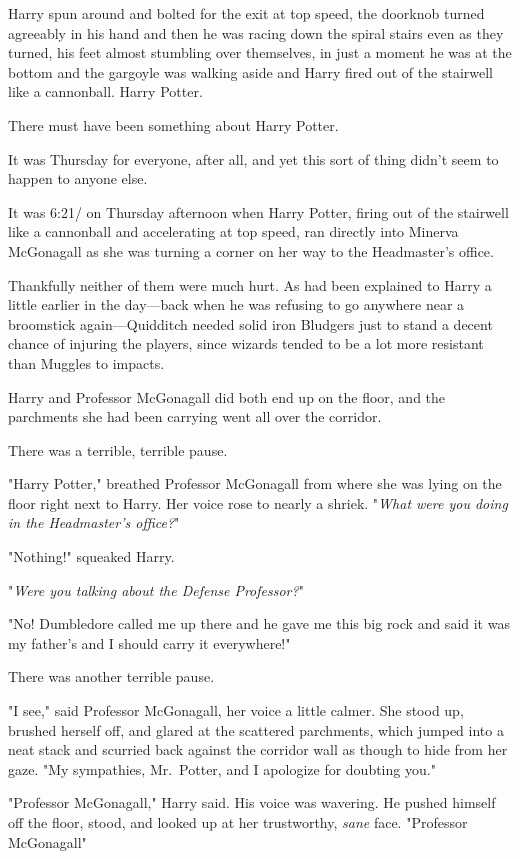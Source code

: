 Harry spun around and bolted for the exit at top speed, the doorknob turned
agreeably in his hand and then he was racing down the spiral stairs even as
they turned, his feet almost stumbling over themselves, in just a moment he was
at the bottom and the gargoyle was walking aside and Harry fired out of the
stairwell like a cannonball.
\sbreak
Harry Potter.

There must have been something about Harry Potter.

It was Thursday for everyone, after all, and yet this sort of thing didn't seem
to happen to anyone else.

It was 6:21\PM/ on Thursday afternoon when Harry Potter, firing out of the
stairwell like a cannonball and accelerating at top speed, ran directly into
Minerva McGonagall as she was turning a corner on her way to the Headmaster's
office.

Thankfully neither of them were much hurt. As had been explained to Harry a
little earlier in the day---back when he was refusing to go anywhere near a
broomstick again---Quidditch needed solid iron Bludgers just to stand a decent
chance of injuring the players, since wizards tended to be a lot more resistant
than Muggles to impacts.

Harry and Professor McGonagall did both end up on the floor, and the parchments
she had been carrying went all over the corridor.

There was a terrible, terrible pause.

"Harry Potter," breathed Professor McGonagall from where she was lying on the
floor right next to Harry. Her voice rose to nearly a shriek. "\emph{What were
you doing in the Headmaster's office?}"

"Nothing!" squeaked Harry.

"\emph{Were you talking about the Defense Professor?}"

"No! Dumbledore called me up there and he gave me this big rock and said it was
my father's and I should carry it everywhere!"

There was another terrible pause.

"I see," said Professor McGonagall, her voice a little calmer. She stood up,
brushed herself off, and glared at the scattered parchments, which jumped into
a neat stack and scurried back against the corridor wall as though to hide from
her gaze. "My sympathies, Mr.~Potter, and I apologize for doubting you."

"Professor McGonagall," Harry said. His voice was wavering. He pushed himself
off the floor, stood, and looked up at her trustworthy, \emph{sane} face.
"Professor McGonagall{\el}"

